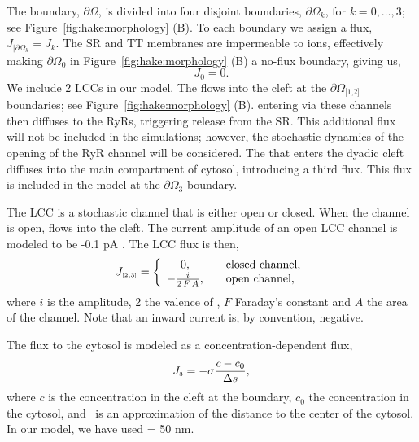 The boundary, $\partial\Omega$, is divided into four disjoint boundaries,
$\partial\Omega_k$, for $k=0,\ldots,3$; see
Figure~\ref{fig:hake:morphology} (B). To each boundary we assign
a flux, $J_{|\partial\Omega_k}=J_k$. The SR and TT membranes are
impermeable to ions, effectively making
$\partial\Omega_{\scriptscriptstyle\text{0}}$ in
Figure~\ref{fig:hake:morphology} (B) a no-flux boundary, giving
us,
\begin{equation}
  \label{eq:hake:no-flux}
  J_{\scriptscriptstyle 0}= 0.
\end{equation}
We include 2 LCCs in our model. The \Ca flows into the cleft at the
$\partial\Omega_{\scriptscriptstyle\text{[1,2]}}$ boundaries; see
Figure~\ref{fig:hake:morphology} (B). \Ca entering via these
channels then diffuses to the RyRs, triggering \Ca release from the
SR. This additional \Ca flux will not be included in the simulations;
however, the stochastic dynamics of the opening of the RyR channel
will be considered. The \Ca that enters the dyadic cleft diffuses into
the main compartment of cytosol, introducing a third flux. This flux
is included in the model at the
$\partial\Omega_{\scriptscriptstyle\text{3}}$ boundary.

The LCC is a stochastic channel that is either open or closed. When
the channel is open, \Ca flows into the cleft. The current amplitude
of an open LCC channel is modeled to be -0.1 pA
\citep{GuiaSternLakattaEtAl2001}. The LCC flux is then,
\begin{equation}
\label{eq:hake:constant-current-flux}
J_{\scriptscriptstyle[2,3]}= \left\{
  \begin{array}{c@{\quad\quad}l}
    0,& \text{closed channel},\\
    - \frac{i}{2\,F\,A},& \text{open channel},
  \end{array}
\right.
\end{equation}
\noindent where $i$ is the amplitude, 2 the valence of \Ca, $F$
Faraday's constant and $A$ the area of the channel. Note that an
inward current is, by convention, negative.

The flux to the cytosol is modeled as a concentration-dependent flux,
\begin{equation}
  \label{eq:hake:conc-dependent-flux}
  J_{\scriptscriptstyle 3}= -\sigma\frac{c - c_0}{\Delta{}s},
\end{equation}
where $c$ is the concentration in the cleft at the boundary, $c_0$ the
concentration in the cytosol, and \Ds~is an approximation of the
distance to the center of the cytosol. In our model, we have used \Ds
= 50 nm.


